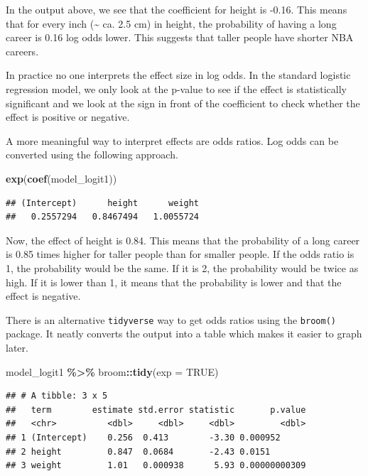 \documentclass[
]{book}
\newenvironment{Shaded}{\begin{snugshade}}{\end{snugshade}}
\newcommand{\AttributeTok}[1]{\textcolor[rgb]{0.13,0.29,0.53}{#1}}
\newcommand{\ConstantTok}[1]{\textcolor[rgb]{0.56,0.35,0.01}{#1}}
\newcommand{\FunctionTok}[1]{\textcolor[rgb]{0.13,0.29,0.53}{\textbf{#1}}}
\newcommand{\NormalTok}[1]{#1}
\newcommand{\SpecialCharTok}[1]{\textcolor[rgb]{0.81,0.36,0.00}{\textbf{#1}}}
\begin{document}
In the output above, we see that the coefficient for height is -0.16. This means
that for every inch (\textasciitilde{} ca. 2.5 cm) in height, the probability of having a long career
is 0.16 log odds lower. This suggests that taller people have shorter NBA careers.

In practice no one interprets the effect size in log odds. In the standard logistic
regression model, we only look at the p-value to see if the effect is statistically
significant and we look at the sign in front of the coefficient to check whether
the effect is positive or negative.

A more meaningful way to interpret effects are odds ratios. Log odds can be
converted using the following approach.

\begin{Shaded}
\begin{Highlighting}[]
\FunctionTok{exp}\NormalTok{(}\FunctionTok{coef}\NormalTok{(model\_logit1))}
\end{Highlighting}
\end{Shaded}

\begin{verbatim}
## (Intercept)      height      weight 
##   0.2557294   0.8467494   1.0055724
\end{verbatim}

Now, the effect of height is 0.84. This means that the probability of a long career
is 0.85 times higher for taller people than for smaller people. If the odds ratio
is 1, the probability would be the same. If it is 2, the probability would be twice
as high. If it is lower than 1, it means that the probability is lower and that
the effect is negative.

There is an alternative \texttt{tidyverse} way to get odds ratios using the \texttt{broom()} package.
It neatly converts the output into a table which makes it easier to graph later.

\begin{Shaded}
\begin{Highlighting}[]
\NormalTok{model\_logit1 }\SpecialCharTok{\%\textgreater{}\%} 
\NormalTok{      broom}\SpecialCharTok{::}\FunctionTok{tidy}\NormalTok{(}\AttributeTok{exp =} \ConstantTok{TRUE}\NormalTok{)}
\end{Highlighting}
\end{Shaded}

\begin{verbatim}
## # A tibble: 3 x 5
##   term        estimate std.error statistic       p.value
##   <chr>          <dbl>     <dbl>     <dbl>         <dbl>
## 1 (Intercept)    0.256  0.413        -3.30 0.000952     
## 2 height         0.847  0.0684       -2.43 0.0151       
## 3 weight         1.01   0.000938      5.93 0.00000000309
\end{verbatim}
\end{document}
